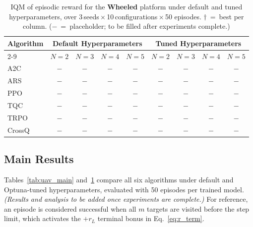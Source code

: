 \documentclass{article}
\begin{document}
\begin{table}[tbp]
\centering
\footnotesize
\caption{\small IQM of episodic reward for the \textbf{Wheeled} platform under default and tuned hyperparameters, over 3\,seeds\,$\times$\,10\,configurations\,$\times$\,50 episodes.
$\dagger$~=~best per column. ($-$~=~placeholder; to be filled after experiments complete.)}
\label{tab:whl_main}
\begin{tabular}{l|cccc|cccc}
    \toprule
    \multirow{2}{*}{\textbf{Algorithm}}
        & \multicolumn{4}{c|}{\textbf{Default Hyperparameters}}
        & \multicolumn{4}{c}{\textbf{Tuned Hyperparameters}} \\
    \cmidrule(lr){2-9}
           & $N=2$ & $N=3$ & $N=4$ & $N=5$
           & $N=2$ & $N=3$ & $N=4$ & $N=5$ \\
    \midrule
    A2C    & $-$ & $-$ & $-$ & $-$ & $-$ & $-$ & $-$ & $-$ \\
    ARS    & $-$ & $-$ & $-$ & $-$ & $-$ & $-$ & $-$ & $-$ \\
    PPO    & $-$ & $-$ & $-$ & $-$ & $-$ & $-$ & $-$ & $-$ \\
    TQC    & $-$ & $-$ & $-$ & $-$ & $-$ & $-$ & $-$ & $-$ \\
    TRPO   & $-$ & $-$ & $-$ & $-$ & $-$ & $-$ & $-$ & $-$ \\
    CrossQ & $-$ & $-$ & $-$ & $-$ & $-$ & $-$ & $-$ & $-$ \\
    \bottomrule
\end{tabular}
\vspace{-6pt}
\end{table}

\subsection{Main Results}
\label{sec:exp:main}

Tables~\ref{tab:uav_main} and~\ref{tab:whl_main} compare all six algorithms under default and Optuna-tuned hyperparameters, evaluated with 50 episodes per trained model. \textit{(Results and analysis to be added once experiments are complete.)} For reference, an episode is considered successful when all $m$ targets are visited before the step limit, which activates the $+r_L$ terminal bonus in Eq.~\eqref{eq:r_term}.
\end{document}
